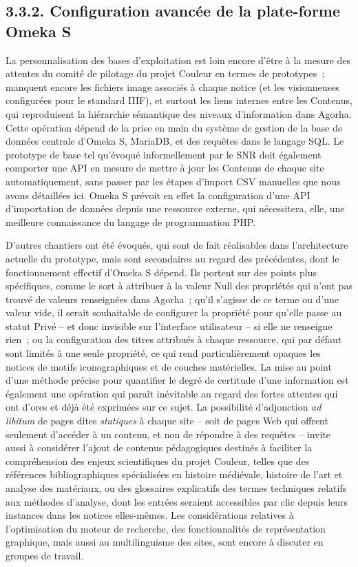 \documentclass[a4paper,12pt, twoside]{book}
\begin{document}
\subsection*{3.3.2. Configuration avancée de la plate-forme Omeka S}

La personnalisation des bases d’exploitation est loin encore d’être à la mesure des attentes du comité de pilotage du projet Couleur en termes de prototypes~; manquent encore les fichiers image associés à chaque notice (et les visionneuses configurées pour le standard IIIF), et surtout les liens internes entre les Contenus, qui reproduisent la hiérarchie sémantique des niveaux d’information dans Agorha. Cette opération dépend de la prise en main du système de gestion de la base de données centrale d’Omeka S, MariaDB, et des requêtes dans le langage SQL. Le prototype de base tel qu’évoqué informellement par le SNR doit également comporter une API en mesure de mettre à jour les Contenus de chaque site automatiquement, sans passer par les étapes d’import CSV manuelles que nous avons détaillées ici. Omeka S prévoit en effet la configuration d’une API d’importation de données depuis une ressource externe, qui nécessitera, elle, une meilleure connaissance du langage de programmation PHP.

D’autres chantiers ont été évoqués, qui sont de fait réalisables dans l’architecture actuelle du prototype, mais sont secondaires au regard des précédentes, dont le fonctionnement effectif d’Omeka S dépend. Ils portent sur des points plus spécifiques, comme le sort à attribuer à la valeur \textsf{Null} des propriétés qui n’ont pas trouvé de valeurs renseignées dans Agorha~; qu’il s’agisse de ce terme ou d’une valeur vide, il serait souhaitable de configurer la propriété pour qu’elle passe au statut \textsf{Privé} – et donc invisible sur l’interface utilisateur – si elle ne renseigne rien~; ou la configuration des titres attribués à chaque ressource, qui par défaut sont limités à une seule propriété, ce qui rend particulièrement opaques les notices de motifs iconographiques et de couches matérielles. La mise au point d’une méthode précise pour quantifier le degré de certitude d’une information est également une opération qui paraît inévitable au regard des fortes attentes qui ont d’ores et déjà été exprimées sur ce sujet. La possibilité d’adjonction \textit{ad libitum} de pages dites \textit{statiques} à chaque site – soit de pages Web qui offrent seulement d’accéder à un contenu, et non de répondre à des requêtes – invite aussi à considérer l’ajout de contenus pédagogiques destinés à faciliter la compréhension des enjeux scientifiques du projet Couleur, telles que des références bibliographiques spécialisées en histoire médiévale, histoire de l’art et analyse des matériaux, ou des glossaires explicatifs des termes techniques relatifs aux méthodes d’analyse, dont les entrées seraient accessibles par clic depuis leurs instances dans les notices elles-mêmes. Les considérations relatives à l’optimisation du moteur de recherche, des fonctionnalités de représentation graphique, mais aussi au multilinguisme des sites, sont encore à discuter en groupes de travail.
\end{document}

